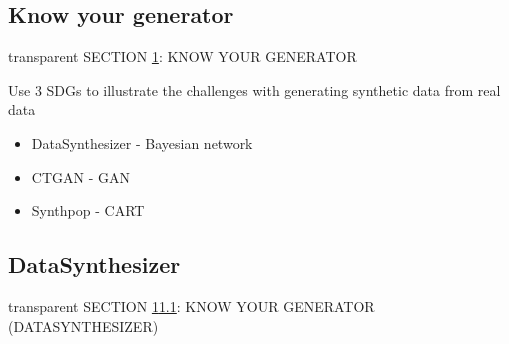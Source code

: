 \documentclass[t,8pt,utfx8]{beamer}
\begin{document}
\begin{spacing}{1.25}

\section{Know your generator}\label{sec:sdg}
\begin{frame}[c,plain]
\vskip-4mm
\begin{beamercolorbox}[wd=\boxwidth,ht=22.11mm]{transparent}%
    \vfill%
    \leftinsert%
    \MakeUppercase{Section \ref{sec:sdg}: Know your generator} %
\end{beamercolorbox}
\vskip-3mm

Use 3 SDGs to illustrate the challenges with generating synthetic data from real data
\begin{itemize}
    \item DataSynthesizer - Bayesian network
    \item CTGAN - GAN
    \item Synthpop - CART
\end{itemize}

\end{frame}



\subsection{DataSynthesizer}\label{sec:sdg_datasynthesizer}
\begin{frame}[c,plain]
\vskip-4mm
\begin{beamercolorbox}[wd=\boxwidth,ht=22.11mm]{transparent}%
    \vfill%
    \leftinsert%
    \MakeUppercase{Section \ref{sec:sdg}\ref{sec:sdg_datasynthesizer}: Know your generator (DataSynthesizer)} %
\end{beamercolorbox}
\vskip-3mm



\end{frame}
\end{spacing}
\end{document}
